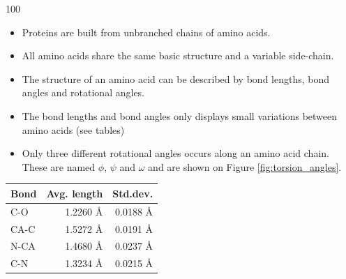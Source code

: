 \documentclass[a0,portrait]{a0poster}
\begin{document}
\begin{GridBlockFill}{0}{46.4}{100}

  \begin{multicols}{2}
\begin{minipage}{\linewidth} 
    \begin{multicols}{2}

    \begin{itemize}
    \item Proteins are built from unbranched chains of amino acids.
    \item All amino acids share
      the same basic structure and a variable side-chain.
    \item The structure of an amino acid can be described by bond lengths,
      bond angles and rotational angles.
    \item The bond lengths and bond angles only displays small variations
      between amino acids (see tables)
    \item Only three different rotational angles occurs along an amino
      acid chain. These are named $\phi$, $\psi$ and $\omega$ and are
      shown on Figure \ref{fig:torsion_angles}.
    \end{itemize} 
   \end{multicols}


\begin{multicols}{2}


\begin{minipage}{\linewidth} 
\centering

  \vspace{7mm}
  \begin{tabular}{lrr}
    \multicolumn{1}{c}{Bond} & \multicolumn{1}{c}{Avg. length} & \multicolumn{1}{c}{Std.dev.} \\ \midrule
    C-O   & 1.2260 Å & 0.0188 Å\\
    CA-C  & 1.5272 Å & 0.0191 Å\\
    N-CA  & 1.4680 Å & 0.0237 Å\\
    C-N   & 1.3234 Å & 0.0215 Å\\
  \end{tabular}
  \vspace{4mm}
  \label{tab:average_bond_lengths}
\end{minipage}



\end{multicols}
\end{minipage}
\end{multicols}
\end{GridBlockFill}
\end{document}
